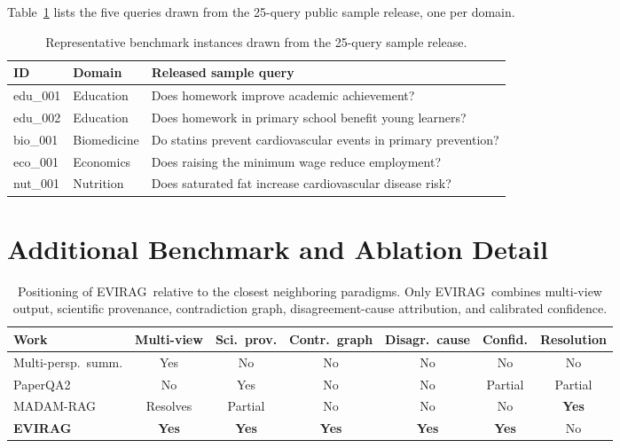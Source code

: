 \documentclass[11pt]{article}
\newcommand{\system}{\textsc{EVIRAG}\xspace}
\begin{document}
Table~\ref{tab:samplequeries} lists the five queries drawn from the
25-query public sample release, one per domain.

\begin{table}[t]
\centering\small
\setlength{\tabcolsep}{4pt}
\begin{tabular}{@{}llp{4.2cm}@{}}
\toprule
\textbf{ID} & \textbf{Domain} & \textbf{Released sample query} \\
\midrule
edu\_001 & Education & Does homework improve academic achievement? \\
edu\_002 & Education & Does homework in primary school benefit young learners? \\
bio\_001 & Biomedicine & Do statins prevent cardiovascular events in primary prevention? \\
eco\_001 & Economics & Does raising the minimum wage reduce employment? \\
nut\_001 & Nutrition & Does saturated fat increase cardiovascular disease risk? \\
\bottomrule
\end{tabular}
\caption{Representative benchmark instances drawn from the 25-query sample
release.}
\label{tab:samplequeries}
\end{table}

\section{Additional Benchmark and Ablation Detail}
\label{app:extra}

\begin{table}[h]
\centering\small
\setlength{\tabcolsep}{5pt}
\begin{tabular}{@{}lcccccc@{}}
\toprule
\textbf{Work} & \textbf{Multi-view} & \textbf{Sci.\ prov.} & \textbf{Contr.\ graph} & \textbf{Disagr.\ cause} & \textbf{Confid.} & \textbf{Resolution} \\
\midrule
Multi-persp.\ summ. & Yes & No & No & No & No & No \\
PaperQA2 & No & Yes & No & No & Partial & Partial \\
MADAM-RAG & Resolves & Partial & No & No & No & \textbf{Yes} \\
\textbf{\system} & \textbf{Yes} & \textbf{Yes} & \textbf{Yes} & \textbf{Yes} & \textbf{Yes} & No \\
\bottomrule
\end{tabular}
\caption{Positioning of \system\ relative to the closest neighboring paradigms.
Only \system\ combines multi-view output, scientific provenance, contradiction
graph, disagreement-cause attribution, and calibrated confidence.}
\label{tab:rw-compare}
\end{table}
\end{document}
